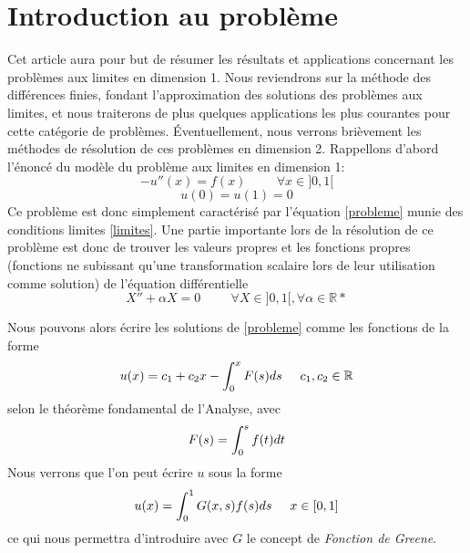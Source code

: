 \documentclass[12pt]{article}
\newcommand{\R}{\mathbb R}
\newcommand{\espace}{\hspace{5mm}}
\begin{document}
\section{Introduction au problème}

\quad Cet article aura pour but de résumer les résultats et applications concernant les problèmes aux limites en dimension 1. Nous reviendrons sur la méthode des différences finies, fondant l'approximation des solutions des problèmes aux limites, et nous traiterons de plus quelques applications les plus courantes pour cette catégorie de problèmes. Éventuellement, nous verrons brièvement les méthodes de résolution de ces problèmes en dimension 2.
Rappellons d'abord l'énoncé du modèle du problème aux limites en dimension 1:
\begin{equation}\label{probleme}
-u''(x) = f(x) \hspace{1cm} \forall x \in ]0,1[ 
\end{equation}
\begin{equation}\label{limites}
u(0) = u(1) = 0
\end{equation}
\quad Ce problème est donc simplement caractérisé par l'équation \eqref{probleme} munie des conditions limites \eqref{limites}. Une partie importante lors de la résolution de ce problème est donc de trouver les valeurs propres et les fonctions propres (fonctions ne subissant qu'une transformation scalaire lors de leur utilisation comme solution) de l'équation différentielle
\begin{equation}
	X'' + \alpha X = 0 \hspace{1cm} \forall X \in ]0,1[ , \forall \alpha \in \mathbb R*
\end{equation}

\quad Nous pouvons alors écrire les solutions de \eqref{probleme} comme les fonctions de la forme
\begin{equation}
\label{solutionsNaives}
	u\relax(x) = c_1 + c_2 x - \int_0^x F(s) ds \espace c_1 , c_2 \in \R
\end{equation}
selon le théorème fondamental de l'Analyse, avec 
\begin{equation}
	F\relax(s) = \int_0^s f(t) dt
\end{equation}
\quad Nous verrons que l'on peut écrire $u$ sous la forme
\begin{equation}
	u\relax(x) = \int_0^1 G\relax(x, s) f\relax(s) ds \espace x \in [0, 1]
\end{equation}
ce qui nous permettra d'introduire avec $G$ le concept de \emph{Fonction de Greene}.
\end{document}
